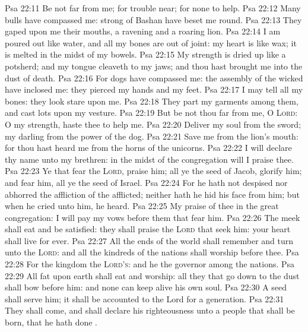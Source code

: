 \vs Psa 22:11 Be not far from me; for trouble  near; for  none to help.
\vs Psa 22:12 Many bulls have compassed me: strong  of Bashan have beset me round.
\vs Psa 22:13 They gaped upon me  their mouths,  a ravening and a roaring lion.
\vs Psa 22:14 I am poured out like water, and all my bones are out of joint: my heart is like wax; it is melted in the midst of my bowels.
\vs Psa 22:15 My strength is dried up like a potsherd; and my tongue cleaveth to my jaws; and thou hast brought me into the dust of death.
\vs Psa 22:16 For dogs have compassed me: the assembly of the wicked have inclosed me: they pierced my hands and my feet.
\vs Psa 22:17 I may tell all my bones: they look  stare upon me.
\vs Psa 22:18 They part my garments among them, and cast lots upon my vesture.
\vs Psa 22:19 But be not thou far from me, O \textsc{Lord}: O my strength, haste thee to help me.
\vs Psa 22:20 Deliver my soul from the sword; my darling from the power of the dog.
\vs Psa 22:21 Save me from the lion's mouth: for thou hast heard me from the horns of the unicorns.
\vs Psa 22:22 I will declare thy name unto my brethren: in the midst of the congregation will I praise thee.
\vs Psa 22:23 Ye that fear the \textsc{Lord}, praise him; all ye the seed of Jacob, glorify him; and fear him, all ye the seed of Israel.
\vs Psa 22:24 For he hath not despised nor abhorred the affliction of the afflicted; neither hath he hid his face from him; but when he cried unto him, he heard.
\vs Psa 22:25 My praise  of thee in the great congregation: I will pay my vows before them that fear him.
\vs Psa 22:26 The meek shall eat and be satisfied: they shall praise the \textsc{Lord} that seek him: your heart shall live for ever.
\vs Psa 22:27 All the ends of the world shall remember and turn unto the \textsc{Lord}: and all the kindreds of the nations shall worship before thee.
\vs Psa 22:28 For the kingdom  the \textsc{Lord's}: and he  the governor among the nations.
\vs Psa 22:29 All  fat upon earth shall eat and worship: all they that go down to the dust shall bow before him: and none can keep alive his own soul.
\vs Psa 22:30 A seed shall serve him; it shall be accounted to the Lord for a generation.
\vs Psa 22:31 They shall come, and shall declare his righteousness unto a people that shall be born, that he hath done .
